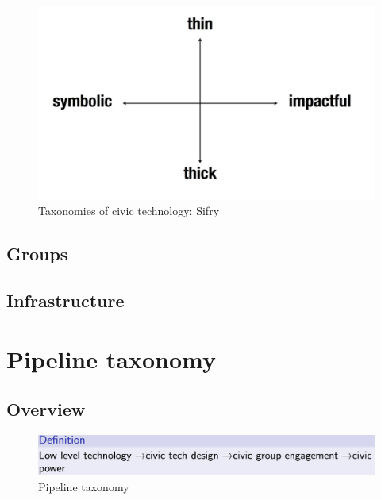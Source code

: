 \documentclass{article}
\begin{document}
			\begin{figure}
				\centering
				\includegraphics[scale=0.5]{images/taxonomy-sifry}
				\caption{Taxonomies of civic technology: Sifry}
				\label{fig:taxonomy-sifry}
			\end{figure}
			        
        \subsection*{Groups}
        
        
        \subsection*{Infrastructure}
        

\section*{Pipeline taxonomy}

        \subsection*{Overview}
        

			\begin{figure}
				\centering
				\includegraphics[scale=0.5]{images/taxonomy-pipeline}
				\caption{Pipeline taxonomy}
				\label{fig:taxonomy-pipeline}
			\end{figure}
\end{document}
